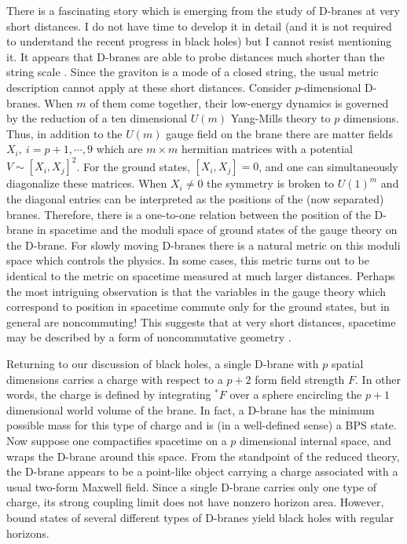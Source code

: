 \documentclass[12pt]{article}
\begin{document}
There is a fascinating story which is emerging from the study
of D-branes at very short distances. I do not have time to develop it
in detail (and it is not required to understand the recent progress
in black holes) but I cannot resist mentioning it. It appears that
D-branes are able to probe distances much shorter than the string
scale \cite{dkps}. Since the graviton is a mode of a closed
string, the usual metric
description cannot apply at these short distances. Consider
$p$-dimensional D-branes.  When $m$ of them come together, their
low-energy dynamics is governed by the reduction of a ten dimensional
$U(m)$ Yang-Mills theory to $p$ dimensions.
Thus, in addition to the $U(m)$ gauge field on the brane there
are matter fields $X_i, \ i=p+1,\cdots, 9$ which are $m\times m$ hermitian
matrices with a potential $V\sim [X_i, X_j]^2$. For the ground states,
$[X_i, X_j]=0$, and one can simultaneously diagonalize these matrices.  When
$X_i\not= 0$ the symmetry is broken to $U(1)^m$ and the diagonal entries
can be interpreted as the positions of the (now separated) branes.
 Therefore,
there is a one-to-one relation between the position of
the D-brane in spacetime and the moduli space of
ground states of the gauge theory on
the D-brane. For slowly moving D-branes there is a natural metric on
this moduli space which controls the physics. In some cases, this
metric turns out to be
identical to the metric on spacetime measured at much larger
distances. Perhaps the most intriguing observation is that
the variables
in the gauge theory which  correspond to position in spacetime 
commute only for the ground states, but in general are noncommuting! This
suggests that at very short distances, spacetime may be described
by a form of noncommutative geometry \cite{con}.


Returning to our discussion of black holes,
a single D-brane with $p$ spatial dimensions 
carries a charge with respect to a $p+2$ form field strength $F$.
In other words, the charge is defined by integrating ${}^*F$ over a sphere
encircling the $p+1$ dimensional world volume of the brane.
In fact, a D-brane has the minimum possible mass for this type of charge
and is (in a well-defined sense) a BPS state.
Now suppose one compactifies spacetime on a $p$ dimensional internal space, and
wraps the D-brane around this space. From the standpoint of the reduced
theory, the D-brane appears to be a point-like object carrying a charge
associated with a usual two-form Maxwell field. Since a single D-brane
carries only one type of charge,  its strong coupling limit does not
have nonzero horizon area. However, bound states of several different
types of D-branes
yield black holes with regular horizons.
\end{document}
